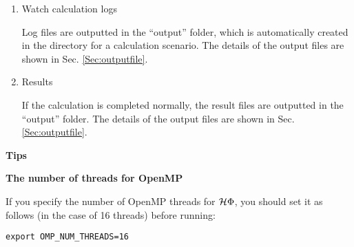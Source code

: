 \begin{enumerate}
\item Watch calculation logs

  Log files are outputted in the ``output'' folder,
  which is automatically created in the directory for a calculation scenario.
  The details of the output files are shown in Sec. \ref{Sec:outputfile}.

\item Results

  If the calculation is completed normally,
  the result files are outputted in  the ``output'' folder.
  The details of the output files are shown in Sec. \ref{Sec:outputfile}.

\end{enumerate}

\begin{screen}
\Large 
{\bf Tips}
\normalsize

{\bf The number of threads for OpenMP}

If you specify the number of OpenMP threads for $\mathcal{H} \Phi$,
you should set it as follows (in the case of 16 threads) before running:
\begin{verbatim}
export OMP_NUM_THREADS=16
\end{verbatim}

\end{screen}

